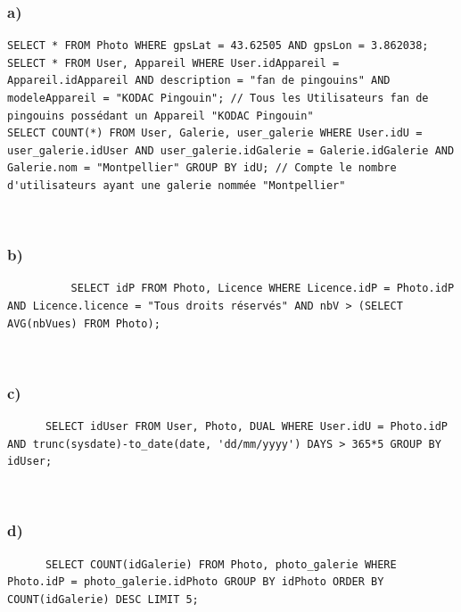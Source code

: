 \documentclass[10pt]{article}
\newenvironment{DDbox}[1]{
\begin{lrbox}{\BBbox}\begin{minipage}{\linewidth}}
{\end{minipage}\end{lrbox}\noindent\colorbox{white}{\usebox{\BBbox}} \\
[.5cm]}
\begin{document}
  \subsubsection{a)}
  \begin{DDbox}{0.4}
   \begin{lstlisting}
SELECT * FROM Photo WHERE gpsLat = 43.62505 AND gpsLon = 3.862038;
SELECT * FROM User, Appareil WHERE User.idAppareil = Appareil.idAppareil AND description = "fan de pingouins" AND modeleAppareil = "KODAC Pingouin"; // Tous les Utilisateurs fan de pingouins possédant un Appareil "KODAC Pingouin"
SELECT COUNT(*) FROM User, Galerie, user_galerie WHERE User.idU = user_galerie.idUser AND user_galerie.idGalerie = Galerie.idGalerie AND Galerie.nom = "Montpellier" GROUP BY idU; // Compte le nombre d'utilisateurs ayant une galerie nommée "Montpellier"
\end{lstlisting}
  \end{DDbox}

  \subsubsection{ b)}
    \begin{DDbox}{0.4}
      \begin{lstlisting}
          SELECT idP FROM Photo, Licence WHERE Licence.idP = Photo.idP AND Licence.licence = "Tous droits réservés" AND nbV > (SELECT AVG(nbVues) FROM Photo);
      \end{lstlisting}
    \end{DDbox}

  \subsubsection{ c)}
  \begin{DDbox}{0.4}
    \begin{lstlisting}
      SELECT idUser FROM User, Photo, DUAL WHERE User.idU = Photo.idP AND trunc(sysdate)-to_date(date, 'dd/mm/yyyy') DAYS > 365*5 GROUP BY idUser;
    \end{lstlisting}
  \end{DDbox}
  \subsubsection{ d)}
  \begin{DDbox}{0.4}
    \begin{lstlisting}
      SELECT COUNT(idGalerie) FROM Photo, photo_galerie WHERE Photo.idP = photo_galerie.idPhoto GROUP BY idPhoto ORDER BY COUNT(idGalerie) DESC LIMIT 5;
    \end{lstlisting}
  \end{DDbox}
\end{document}
